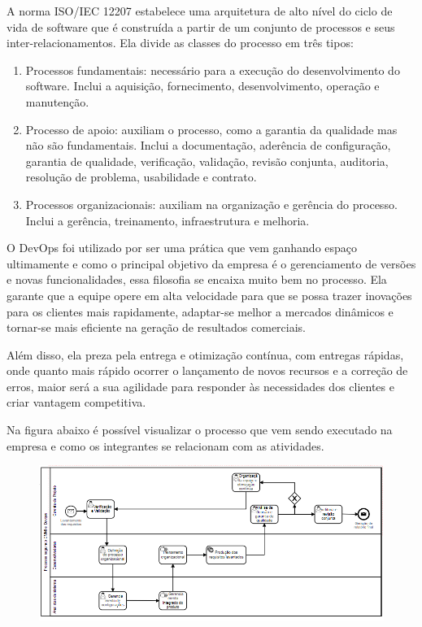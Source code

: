 \documentclass[	DIV=calc,%
							paper=a4,%
							fontsize=12pt,%
							onecolumn]{scrartcl}	 					%
\begin{document}
A norma ISO/IEC 12207 estabelece uma arquitetura de alto nível do ciclo de vida de software que é construída a partir de um conjunto de processos e seus inter-relacionamentos. Ela divide as classes do processo em três tipos:

\begin{enumerate}
	\item Processos fundamentais: necessário para a execução do desenvolvimento do software. Inclui a aquisição, fornecimento,
	desenvolvimento, operação e manutenção.
	\item Processo de apoio: auxiliam o processo, como a garantia da qualidade mas não são fundamentais. Inclui a documentação,
	aderência de configuração, garantia de qualidade, verificação, validação, revisão conjunta, auditoria, resolução de problema,
	usabilidade e contrato.
	\item Processos organizacionais: auxiliam na organização e gerência do processo. Inclui a gerência, treinamento, infraestrutura e melhoria.
\end{enumerate}

O DevOps foi utilizado por ser uma prática que vem ganhando espaço ultimamente e como o principal objetivo da empresa é o gerenciamento de versões e novas funcionalidades, essa filosofia se encaixa muito bem no processo. Ela garante que a equipe opere em alta velocidade para que se possa trazer inovações para os clientes mais rapidamente, adaptar-se melhor a mercados dinâmicos e tornar-se mais eficiente na geração de resultados comerciais. 

Além disso, ela preza pela entrega e otimização contínua, com entregas rápidas, onde quanto mais rápido ocorrer o lançamento de novos recursos e a correção de erros, maior será a sua agilidade para responder às necessidades dos clientes e criar vantagem competitiva. 


Na figura abaixo é possível visualizar o processo que vem sendo executado na empresa e como os integrantes se relacionam com as atividades.

\begin{figure}[!h]
	\centering
	\includegraphics[scale=0.8]{processo-final(bpmn)}
\end{figure}
\end{document}
